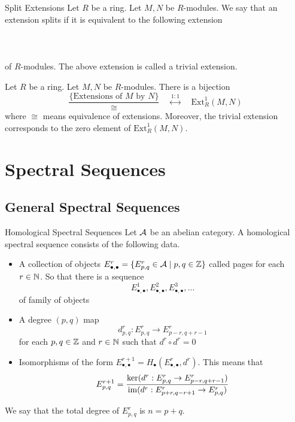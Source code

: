 \documentclass[a4paper]{article}
\begin{document}
\begin{defn}{Split Extensions}{} Let $R$ be a ring. Let $M,N$ be $R$-modules. We say that an extension splits if it is equivalent to the following extension \\~\\
 \\~\\
of $R$-modules. The above extension is called a trivial extension. 
\end{defn}

\begin{thm}{}{} Let $R$ be a ring. Let $M,N$ be $R$-modules. There is a bijection $$\frac{\{\text{Extensions of }M\text{ by }N\}}{\cong}\;\;\;\;\overset{1:1}{\longleftrightarrow}\;\;\;\;\text{Ext}_R^1(M,N)$$ where $\cong$ means equivalence of extensions. Moreover, the trivial extension corresponds to the zero element of $\text{Ext}_R^1(M,N)$. 
\end{thm}

\pagebreak
\section{Spectral Sequences}
\subsection{General Spectral Sequences}
\begin{defn}{Homological Spectral Sequences}{} Let $\mathcal{A}$ be an abelian category. A homological spectral sequence consists of the following data.  
\begin{itemize}
\item A collection of objects $E_{\bullet,\bullet}^r=\{E_{p,q}^r\in\mathcal{A}\;|\;p,q\in\mathbb{Z}\}$ called pages for each $r\in\mathbb{N}$. So that there is a sequence $$E_{\bullet,\bullet}^1,E_{\bullet,\bullet}^2,E_{\bullet,\bullet}^3,\dots$$ of family of objects
\item A degree $(p,q)$ map $$d_{p,q}^r:E_{p,q}^r\to E_{p-r,q+r-1}^r$$ for each $p,q\in\mathbb{Z}$ and $r\in\mathbb{N}$ such that $d^r\circ d^r=0$
\item Isomorphisms of the form $E_{\bullet,\bullet}^{r+1}=H_\bullet(E_{\bullet,\bullet}^r,d^r)$. This means that $$E_{p,q}^{r+1}=\frac{\ker(d^r:E_{p,q}^r\to E_{p-r,q+r-1}^r)}{\operatorname{im}(d^r:E_{p+r,q-r+1}^r\to E_{p,q}^r)}$$
\end{itemize}
We say that the total degree of $E_{p,q}^r$ is $n=p+q$. 
\end{defn}
\end{document}
